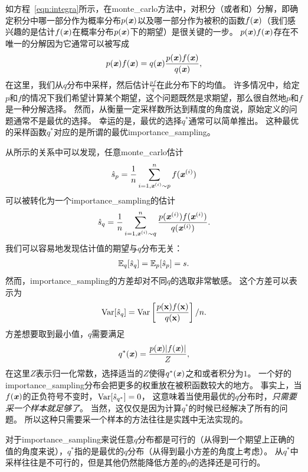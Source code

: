如方程~\eqref{eqn:integra}所示，在\gls{monte_carlo}方法中，对积分（或者和）分解，即确定积分中哪一部分作为概率分布$p(\boldsymbol{\mathit{x}})$以及哪一部分作为被积的函数$f(\boldsymbol{\mathit{x}})$（我们感兴趣的是估计$f(\boldsymbol{\mathit{x}})$在概率分布$p(\boldsymbol{\mathit{x}})$下的期望）是很关键的一步。
$p(\boldsymbol{\mathit{x}})f(\boldsymbol{\mathit{x}})$存在不唯一的分解因为它通常可以被写成
\begin{align}
\label{eqn:decomposition}
p(\boldsymbol{\mathit{x}})f(\boldsymbol{\mathit{x}}) = q(\boldsymbol{\mathit{x}}) \frac{p(\boldsymbol{\mathit{x}})f(\boldsymbol{\mathit{x}})}{q(\boldsymbol{\mathit{x}})},
\end{align}
在这里，我们从$q$分布中采样，然后估计$\frac{pf}{q}$在此分布下的均值。
许多情况中，给定$p$和$f$的情况下我们希望计算某个期望，这个问题既然是求期望，那么很自然地$p$和$f$是一种分解选择。
然而，从衡量一定采样数所达到精度的角度说，原始定义的问题通常不是最优的选择。
幸运的是，最优的选择$q^*$通常可以简单推出。
这种最优的采样函数$q^*$对应的是所谓的最优\gls{importance_sampling}。


从所示的关系中可以发现，任意\gls{monte_carlo}估计
\begin{align}
\hat{s}_p = \frac{1}{n}\sum_{i=1,\boldsymbol{\mathit{x}}^{(i)}\sim p}^{n}f(\boldsymbol{\mathit{x}}^{(i)})
\end{align}
可以被转化为一个\gls{importance_sampling}的估计
\begin{align}
\hat{s}_q = \frac{1}{n}\sum_{i=1,\boldsymbol{\mathit{x}}^{(i)}\sim q}^{n}\frac{p(\boldsymbol{\mathit{x}}^{(i)})f(\boldsymbol{\mathit{x}}^{(i)})}{q(\boldsymbol{\mathit{x}}^{(i)})}.
\end{align}
我们可以容易地发现估计值的期望与$q$分布无关：
\begin{align}
\mathbb{E}_q [\hat{s}_q] = \mathbb{E}_p [\hat{s}_p] = s.
\end{align}
然而，\gls{importance_sampling}的方差却对不同$q$的选取非常敏感。
这个方差可以表示为
\begin{align}
\label{eqn:variance_of_is}
\text{Var} [\hat{s}_q] = \text{Var} \left[\frac{p(\mathbf{x})f(\mathbf{x})}{q(\mathbf{x})}\right]/n.
\end{align}
方差想要取到最小值，$q$需要满足
\begin{align}
q^*(\boldsymbol{\mathit{x}}) = \frac{p(\boldsymbol{\mathit{x}})\vert f(\boldsymbol{\mathit{x}})\vert}{Z},
\end{align}
在这里$Z$表示归一化常数，选择适当的$Z$使得$q^*(\boldsymbol{\mathit{x}})$之和或者积分为$1$。
一个好的\gls{importance_sampling}分布会把更多的权重放在被积函数较大的地方。
事实上，当$f(\boldsymbol{\mathit{x}})$的正负符号不变时，$\text{Var}[\hat{s}_{q^*}]=0$， 这意味着当使用最优的$q$分布时，\emph{只需要采一个样本就足够了}。
当然，这仅仅是因为计算$q^*$的时候已经解决了所有的问题。
所以这种只需要采一个样本的方法往往是实践中无法实现的。


对于\gls{importance_sampling}来说任意$q$分布都是可行的（从得到一个期望上正确的值的角度来说），$q^*$指的是最优的$q$分布（从得到最小方差的角度上考虑）。
从$q^*$中采样往往是不可行的，但是其他仍然能降低方差的$q$的选择还是可行的。




